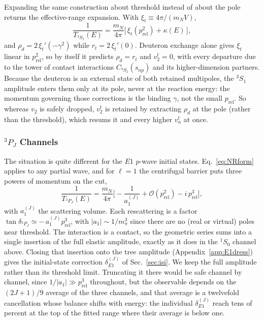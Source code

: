 \documentclass[
  aps,prd,twocolumn,nofootinbib,superscriptaddress,
  longbibliography,floatfix,preprintnumbers
]{revtex4-2}
\newcommand{\prel}{p_{\mathrm{rel}}}
\newcommand{\Eone}{E1}
\begin{document}
Expanding the same construction about threshold instead of about the pole
returns the effective-range expansion. With $\xi_t\equiv4\pi/(m_N V)$,
\begin{equation}
  \frac{1}{T_{^3S_1}(E)} = \frac{m_N}{4\pi}\big[\,\xi_t(\prel^2)+\kappa(E)\,\big],
\end{equation}
and $\rho_{d}=2\,\xi_t'(-\gamma^{2})$ while $r_{t}=2\,\xi_t'(0)$. 
Deuteron exchange alone gives
$\xi_t$ linear in $\prel^{2}$, so by itself it predicts $\rho_{d}=r_{t}$ and
$v_2^t=0$, with every departure due to the tower of contact interactions
$C_{^3S_1}(s_{np})$ and its higher-dimension partners. Because the deuteron is
an external state of both retained multipoles, the ${}^{3}S_1$ amplitude enters
them only at its pole, never at the reaction energy: the momentum governing
those corrections is the binding $\gamma$, not the small
$\prel$.  So whereas $v_2$ is safely dropped, $v_2^t$ is retained by extracting $\rho_{d}$ at the pole
(rather than the threshold), which resums it and every higher $v_n^t$ at once.

\subsubsection{${}^{3}P_J$ Channels}

The situation is quite different for the $\Eone$ $p$-wave initial states.
Eq.~\eqref{eq:NRform} applies to any partial wave, and for $\ell=1$ the centrifugal barrier puts three powers of momentum on the cut,
\begin{equation}
  \frac{1}{T_{^{3}P_J}(E)} = \frac{m_N}{4\pi}\Big[
  -\frac{1}{a_{1}^{(J)}} + \mathcal{O}(\prel^{2}) - i\,\prel^{3}\Big],
  \label{eq:Pwave}
\end{equation}
with $a_{1}^{(J)}$ the scattering volume. Each rescattering is a factor
$\tan\delta_{^{3}P_J}\simeq -\,a_{1}^{(J)}\prel^{3}$, with $|a_{1}|\sim1/m_\pi^{3}$ since there are no (real or virtual) poles
near threshold.  The interaction is a contact, so the geometric series sums into a
single insertion of the full elastic amplitude, exactly as it does in the $^{1}S_{0}$
channel above. Closing that insertion onto the tree amplitude
(Appendix~\ref{app:E1dress}) gives the initial-state correction
$\delta_{\Eone}^{(J)}$ of Sec.~\ref{sec:isi}. We keep the full amplitude rather
than its threshold limit. Truncating it there would be safe channel by channel,
since $1/|a_{1}|\gg\prel^{3}$ throughout, but the observable depends on the
$(2J+1)/9$ average of the three channels, and that average is a twelvefold
cancellation whose balance shifts with energy: the individual
$\delta_{\Eone}^{(J)}$ reach tens of percent at the top of the fitted range where
their average is below one.
\end{document}

